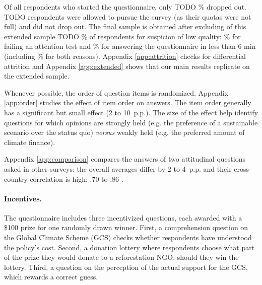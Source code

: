 \documentclass[12pt,english]{article}
\begin{document}
\begin{bibunit}
Of all respondents who started the questionnaire, only TODO \% dropped out. TODO respondents were allowed to pursue the survey (as their quotas were not full) and did not drop out.  The final sample is obtained after excluding of this extended sample TODO \% of respondents for suspicion of low quality: \% for failing an attention test and \% for answering the questionnaire in less than 6 min (including \% for both reasons). Appendix \ref{app:attrition} checks for differential attrition and Appendix \ref{app:extended} shows that our main results replicate on the extended sample. 

Whenever possible, the order of question items is randomized. Appendix \ref{app:order} studies the effect of item order on answers. The item order generally has a significant but small effect (2 to 10~p.p.). The size of the effect help identify questions for which opinions are strongly held (e.g. the preference of a sustainable scenario over the status quo) \textit{versus} weakly held (e.g. the preferred amount of climate finance). %

Appendix \ref{app:comparison} compares the answers of two attitudinal questions asked in other surveys: the overall averages differ by 2 to 4~p.p. and their cross-country correlation is high: .70 \citep{global_nation_global_2023} to .86 \citep{cappelen_majority_2025}. 

\paragraph{Incentives.}
The questionnaire includes three incentivized questions, each awarded with a \$100 prize for one randomly drawn winner. First, a comprehension question on the Global Climate Scheme (GCS) checks whether respondents have understood the policy's cost. %
Second, a donation lottery where respondents choose what part of the prize they would donate to a reforestation NGO, should they win the lottery. Third, a question on the perception of the actual support for the GCS, which rewards a correct guess.


\end{bibunit}
\end{document}
